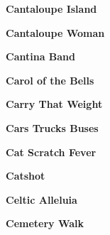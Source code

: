 \vspace{10pt} 
\begin{center}\textbf{Cantaloupe Island}\end{center}
\newline
\vspace{10pt} 
\begin{center}\textbf{Cantaloupe Woman}\end{center}
\newline
\vspace{10pt} 
\begin{center}\textbf{Cantina Band}\end{center}
\newline
\vspace{10pt} 
\begin{center}\textbf{Carol of the Bells}\end{center}
\newline
\vspace{10pt} 
\begin{center}\textbf{Carry That Weight}\end{center}
\newline
\vspace{10pt} 
\begin{center}\textbf{Cars Trucks Buses}\end{center}
\newline
\vspace{10pt} 
\begin{center}\textbf{Cat Scratch Fever}\end{center}
\newline
\vspace{10pt} 
\begin{center}\textbf{Catshot}\end{center}
\newline
\vspace{10pt} 
\begin{center}\textbf{Celtic Alleluia}\end{center}
\newline
\vspace{10pt} 
\begin{center}\textbf{Cemetery Walk}\end{center}
